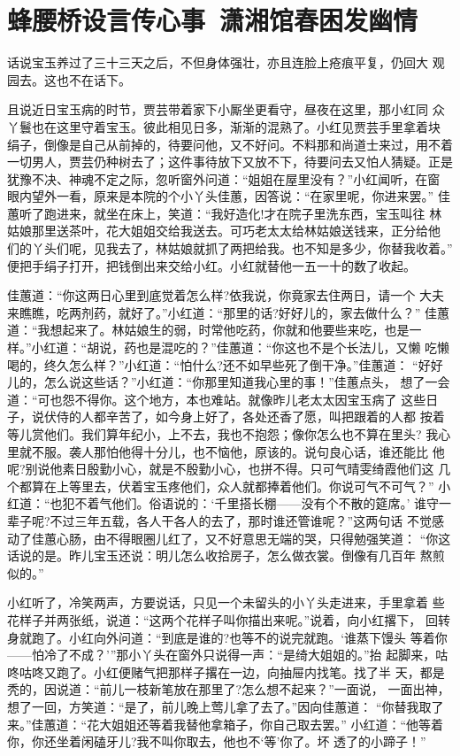\chapter{蜂腰桥设言传心事~潇湘馆春困发幽情}

话说宝玉养过了三十三天之后，不但身体强壮，亦且连脸上疮痕平复，仍回大
观园去。这也不在话下。

且说近日宝玉病的时节，贾芸带着家下小厮坐更看守，昼夜在这里，那小红同
众丫鬟也在这里守着宝玉。彼此相见日多，渐渐的混熟了。小红见贾芸手里拿着块
绢子，倒像是自己从前掉的，待要问他，又不好问。不料那和尚道士来过，用不着
一切男人，贾芸仍种树去了；这件事待放下又放不下，待要问去又怕人猜疑。正是
犹豫不决、神魂不定之际，忽听窗外问道：“姐姐在屋里没有？”小红闻听，在窗
眼内望外一看，原来是本院的个小丫头佳蕙，因答说：“在家里呢，你进来罢。”
佳蕙听了跑进来，就坐在床上，笑道：“我好造化!才在院子里洗东西，宝玉叫往
林姑娘那里送茶叶，花大姐姐交给我送去。可巧老太太给林姑娘送钱来，正分给他
们的丫头们呢，见我去了，林姑娘就抓了两把给我。也不知是多少，你替我收着。”
便把手绢子打开，把钱倒出来交给小红。小红就替他一五一十的数了收起。

佳蕙道：“你这两日心里到底觉着怎么样?依我说，你竟家去住两日，请一个
大夫来瞧瞧，吃两剂药，就好了。”小红道：“那里的话?好好儿的，家去做什么？”
佳蕙道：“我想起来了。林姑娘生的弱，时常他吃药，你就和他要些来吃，也是一
样。”小红道：“胡说，药也是混吃的？”佳蕙道：“你这也不是个长法儿，又懒
吃懒喝的，终久怎么样？”小红道：“怕什么?还不如早些死了倒干净。”佳蕙道：
“好好儿的，怎么说这些话？”小红道：“你那里知道我心里的事！”佳蕙点头，
想了一会道：“可也怨不得你。这个地方，本也难站。就像昨儿老太太因宝玉病了
这些日子，说伏侍的人都辛苦了，如今身上好了，各处还香了愿，叫把跟着的人都
按着等儿赏他们。我们算年纪小，上不去，我也不抱怨；像你怎么也不算在里头?
我心里就不服。袭人那怕他得十分儿，也不恼他，原该的。说句良心话，谁还能比
他呢?别说他素日殷勤小心，就是不殷勤小心，也拼不得。只可气晴雯绮霞他们这
几个都算在上等里去，伏着宝玉疼他们，众人就都捧着他们。你说可气不可气？”
小红道：“也犯不着气他们。俗语说的：‘千里搭长棚——没有个不散的筵席。’
谁守一辈子呢?不过三年五载，各人干各人的去了，那时谁还管谁呢？”这两句话
不觉感动了佳蕙心肠，由不得眼圈儿红了，又不好意思无端的哭，只得勉强笑道：
“你这话说的是。昨儿宝玉还说：明儿怎么收拾房子，怎么做衣裳。倒像有几百年
熬煎似的。”

小红听了，冷笑两声，方要说话，只见一个未留头的小丫头走进来，手里拿着
些花样子并两张纸，说道：“这两个花样子叫你描出来呢。”说着，向小红撂下，
回转身就跑了。小红向外问道：“到底是谁的?也等不的说完就跑。‘谁蒸下馒头
等着你——怕冷了不成？’”那小丫头在窗外只说得一声：“是绮大姐姐的。”抬
起脚来，咕咚咕咚又跑了。小红便赌气把那样子撂在一边，向抽屉内找笔。找了半
天，都是秃的，因说道：“前儿一枝新笔放在那里了?怎么想不起来？”一面说，
一面出神，想了一回，方笑道：“是了，前儿晚上莺儿拿了去了。”因向佳蕙道：
“你替我取了来。”佳蕙道：“花大姐姐还等着我替他拿箱子，你自己取去罢。”
小红道：“他等着你，你还坐着闲磕牙儿?我不叫你取去，他也不‘等’你了。坏
透了的小蹄子！”


